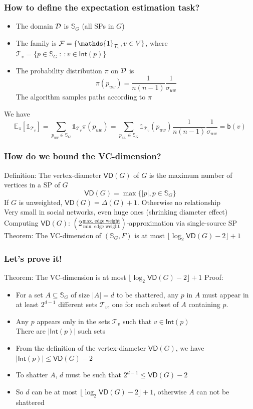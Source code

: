 \documentclass[aspectratio=169]{beamer}
\newcommand*{\expectation}{\mathbb{E}\xspace}
\newcommand*{\family}{{\cal F}\xspace}
\newcommand*{\domain}{{\cal D}\xspace}
\newcommand*{\prob}{\pi\xspace}
\newcommand*{\betw}{\ensuremath{\mathsf{b}}\xspace}
\begin{document}
\begin{frame}
  \frametitle{How to define the expectation estimation task?}
  \begin{itemize}
    \item The domain $\domain$ is $\mathbb{S}_G$ (all SPs in $G$)\\
    \item The family is $\family=\{\mathds{1}_{\mathcal{T}_v}, v\in V\}$,
      where $\mathcal{T}_v=\{p\in\mathbb{S}_G ~:~: v\in\mathsf{Int}(p)\}$
    \item The probability distribution $\prob$ on $\domain$ is
      \[
        \pi(p_{uw})=\frac{1}{n(n-1)}\frac{1}{\sigma_{uw}}
      \]
      The algorithm samples paths according to $\pi$
  \end{itemize}
  \vfill
  We have
  \[
    \expectation_\pi[\mathds{1}_{\mathcal{T}_v}]=\sum_{p_{uw}\in\mathbb{S}_G}\mathds{1}_{\mathcal{T}_v}\pi(p_{uw})=\sum_{p_{uw}\in\mathbb{S}_G}\mathds{1}_{\mathcal{T}_v}(p_{uw})\frac{1}{n(n-1)}\frac{1}{\sigma_{uw}}=\betw(v)
  \]
\end{frame}

\begin{frame}
  \frametitle{How do we bound the VC-dimension?}
  Definition: The vertex-diameter $\mathsf{VD}(G)$ of $G$ is the maximum
  number of vertices in a SP of $G$
  \[
    \mathsf{VD}(G)=\max\{|p|, p\in\mathbb{S}_G\}
  \]
  If $G$ is unweighted, $\mathsf{VD}(G)=\Delta(G)+1$. Otherwise no relationship\\
  Very small in social networks, even huge ones (shrinking diameter effect)
  \vfill
  Computing $\mathsf{VD}(G)$: $\left(2\frac{\mbox{max.~edge weight}}{\mbox{min.~edge
  weight}}\right)$-approximation via single-source SP
  \vfill
  Theorem: The VC-dimension of $(\mathbb{S}_G,F)$ is at most $\lfloor\log_2\mathsf{VD}(G)
  -2\rfloor +1$
\end{frame}

\begin{frame}
  \frametitle{Let's prove it!}
  Theorem: The VC-dimension is at most $\lfloor\log_2\mathsf{VD}(G)
  -2\rfloor +1$
  \vfill
  Proof:
  \begin{itemize}
    \item For a set $A\subseteq\mathbb{S}_G$ of size $|A|=d$ to be
      shattered, any $p$ in $A$ must appear in at least $2^{d-1}$
      different sets $\mathcal{T}_v$, one for each subset of $A$
      containing $p$.
    \item Any $p$ appears only in the sets $\mathcal{T}_v$ such that
      $v\in\mathsf{Int}(p)$\\
      \quad There are $|\mathsf{Int}(p)|$ such sets
    \item From the definition of the vertex-diameter $\mathsf{VD}(G)$, we have
      $|\mathsf{Int}(p)|\le\mathsf{VD}(G)-2$
    \item To shatter $A$, $d$ must be such that $2^{d-1}\le\mathsf{VD}(G)-2$
    \item So $d$ can be at most $\lfloor\log_2\mathsf{VD}(G) -2\rfloor +1$,
      otherwise $A$ can not be shattered
  \end{itemize}
\end{frame}
\end{document}
